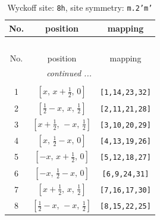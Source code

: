 \documentclass[fleqn,8pt]{jsarticle}
\begin{document}
\begin{longtable}{ccc}
\caption{Wyckoff site: {\tt 8h}, site symmetry: {\tt m.2'm'}}
 \\
 \hline \hline
No. & position & mapping \\ \hline \endfirsthead

\multicolumn{2}{l}{\tablename\ \thetable{}} \\
 \hline \hline
No. & position & mapping \\ \hline \endhead

 \hline \hline
\multicolumn{2}{r}{\footnotesize\it continued ...} \\ \endfoot

 \hline \hline
\multicolumn{2}{r}{} \\ \endlastfoot

1 & $\left[ x,\, x + \frac{1}{2},\, 0 \right]$ & {\tt [1,14,23,32]} \\ \hline
2 & $\left[ \frac{1}{2} - x,\, x,\, \frac{1}{2} \right]$ & {\tt [2,11,21,28]} \\ \hline
3 & $\left[ x + \frac{1}{2},\, - x,\, \frac{1}{2} \right]$ & {\tt [3,10,20,29]} \\ \hline
4 & $\left[ x,\, \frac{1}{2} - x,\, 0 \right]$ & {\tt [4,13,19,26]} \\ \hline
5 & $\left[ - x,\, x + \frac{1}{2},\, 0 \right]$ & {\tt [5,12,18,27]} \\ \hline
6 & $\left[ - x,\, \frac{1}{2} - x,\, 0 \right]$ & {\tt [6,9,24,31]} \\ \hline
7 & $\left[ x + \frac{1}{2},\, x,\, \frac{1}{2} \right]$ & {\tt [7,16,17,30]} \\ \hline
8 & $\left[ \frac{1}{2} - x,\, - x,\, \frac{1}{2} \right]$ & {\tt [8,15,22,25]} \\
\end{longtable}
\renewcommand{\arraystretch}{1.2}
\end{document}
